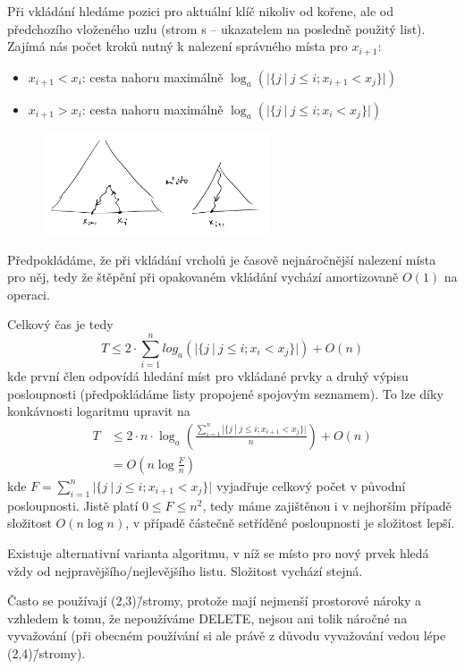 \documentclass[11pt]{report} %
\numberwithin{equation}{section}
\begin{document}
Při vkládání hledáme pozici pro aktuální klíč nikoliv od kořene, ale od předchozího vloženého uzlu (strom s  -- ukazatelem na posledně použitý list). Zajímá nás počet kroků nutný k nalezení správného místa pro $x_{i+1}$:
\begin{itemize}
\item $x_{i+1} < x_i$: cesta nahoru maximálně $\log_a(|\{j\ |\ j\leq i; x_{i+1} < x_{j} \}|)$
\item $x_{i+1} > x_i$: cesta nahoru maximálně $\log_a(|\{j\ |\ j\leq i; x_{i} < x_{j} \}|)$
\end{itemize}

\begin{figure}[H]
	\centering\includegraphics[width=0.6\textwidth]{img/asort.png}
\end{figure}


Předpokládáme, že při vkládání vrcholů je časově nejnáročnější nalezení místa pro něj, tedy že štěpění při opakovaném vkládání vychází amortizovaně $O(1)$ na operaci.

Celkový čas je tedy
$$T \leq 2\cdot \sum\limits_{i=1}^{n} log_a(|\{j\ |\ j\leq i; x_{i} < x_{j} \}|) + O(n)$$
kde první člen odpovídá hledání míst pro vkládané prvky a druhý výpisu posloupnosti (předpokládáme listy propojené spojovým seznamem). To lze díky konkávnosti logaritmu upravit na
\begin{align*}
T &\leq 2\cdot n\cdot \log_a\left(\frac{\sum\limits_{i=1}^{n} |\{j\ |\ j\leq i; x_{i+1} < x_{j} \}|}{n}\right) + O(n)\\
&= O(n\log\frac{F}{n})
\end{align*}
kde $F = \sum\limits_{i=1}^{n} |\{j\ |\ j\leq i; x_{i+1} < x_{j} \}|$ vyjadřuje celkový počet  v původní posloupnosti. Jistě platí $0 \leq F \leq n^2$, tedy máme zajištěnou i v nejhorším případě složitost $O(n\log n)$, v případě částečně setříděné posloupnosti je složitost lepší.

Existuje alternativní varianta algoritmu, v níž se místo pro nový prvek hledá vždy od nejpravějšího/nejlevějšího listu. Složitost vychází stejná.

Často se používají (2,3)\=/stromy, protože mají nejmenší prostorové nároky a vzhledem k tomu, že nepoužíváme DELETE, nejsou ani tolik náročné na vyvažování (při obecném používání si ale právě z důvodu vyvažování vedou lépe (2,4)\=/stromy).
\end{document}
